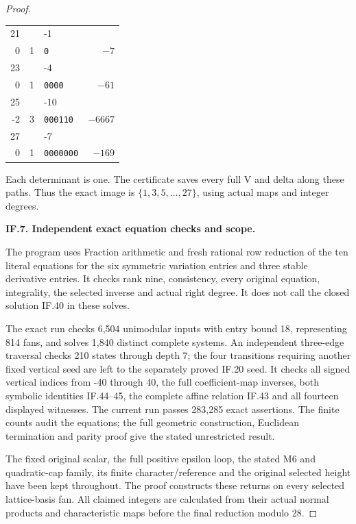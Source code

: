 \begin{proof}
\begin{center}
\begin{longtable}{rclr}
21 & \(\left(\begin{smallmatrix}1&-1\\0&1\end{smallmatrix}\right)\) & \texttt{0} & \(-7\) \\
23 & \(\left(\begin{smallmatrix}1&-4\\0&1\end{smallmatrix}\right)\) & \texttt{0000} & \(-61\) \\
25 & \(\left(\begin{smallmatrix}7&-10\\-2&3\end{smallmatrix}\right)\) & \texttt{000110} & \(-6667\) \\
27 & \(\left(\begin{smallmatrix}1&-7\\0&1\end{smallmatrix}\right)\) & \texttt{0000000} & \(-169\) \\
\bottomrule\end{longtable}\end{center}
Each determinant is one.  The certificate saves every full V and
delta along these paths.  Thus the exact image is
\(\{1,3,5,\ldots,27\}\), using actual maps and integer degrees.

\par\medskip\noindent\textbf{IF.7. Independent exact equation checks and scope.}\par\nopagebreak[4]

The program
 uses Fraction
arithmetic and fresh rational row reduction of the ten literal
equations for the six symmetric variation entries and three stable
derivative entries.  It checks rank nine, consistency, every original
equation, integrality, the selected inverse and actual right degree.
It does not call the closed solution IF.40 in these solves.

The exact run checks 6,504 unimodular inputs with entry bound 18,
representing 814 fans, and solves 1,840 distinct complete systems.  An
independent three-edge traversal checks 210 states through depth 7;
the four transitions requiring another fixed vertical seed are left
to the separately proved IF.20 seed.  It checks all signed vertical
indices from -40 through 40, the full coefficient-map inverses, both
symbolic identities IF.44--45, the complete affine relation IF.43
and all fourteen displayed witnesses.  The current run passes 283,285 exact
assertions.  The finite counts audit the equations; the full geometric
construction, Euclidean termination and parity proof give the stated
unrestricted result.

The fixed original scalar, the full positive epsilon loop, the stated
M6 and quadratic-cap family, its finite character/reference and the
original selected height have been kept throughout.  The proof
constructs these returns on every selected lattice-basis fan.  All
claimed integers are calculated from their actual normal products
and characteristic maps before the final reduction modulo 28.
\end{proof}
